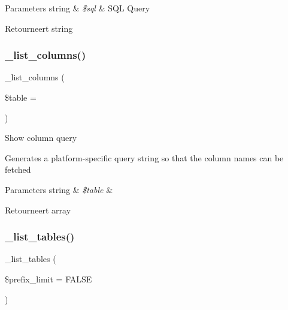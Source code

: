 \begin{DoxyParams}[1]{Parameters}
string & {\em \$sql} & S\+QL Query \\
\hline
\end{DoxyParams}
\begin{DoxyReturn}{Retourneert}
string 
\end{DoxyReturn}
\mbox{\label{class_c_i___d_b__pdo__ibm__driver_a7ccb7f9c301fe7f0a9db701254142b63}} 
\subsubsection{\texorpdfstring{\_list\_columns()}{\_list\_columns()}}
{\footnotesize\ttfamily \+\_\+list\+\_\+columns (\begin{DoxyParamCaption}\item[{}]{\$table = {\ttfamily \textquotesingle{}\textquotesingle{}} }\end{DoxyParamCaption})\hspace{0.3cm}{\ttfamily [protected]}}

Show column query

Generates a platform-\/specific query string so that the column names can be fetched


\begin{DoxyParams}[1]{Parameters}
string & {\em \$table} & \\
\hline
\end{DoxyParams}
\begin{DoxyReturn}{Retourneert}
array 
\end{DoxyReturn}
\mbox{\label{class_c_i___d_b__pdo__ibm__driver_a435c0f3ce54fe7daa178baa8532ebd54}} 
\subsubsection{\texorpdfstring{\_list\_tables()}{\_list\_tables()}}
{\footnotesize\ttfamily \+\_\+list\+\_\+tables (\begin{DoxyParamCaption}\item[{}]{\$prefix\+\_\+limit = {\ttfamily FALSE} }\end{DoxyParamCaption})\hspace{0.3cm}{\ttfamily [protected]}}


